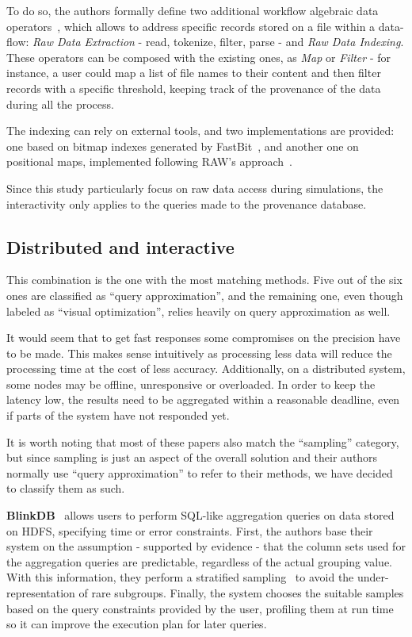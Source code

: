 To do so, the authors formally define two additional workflow 
algebraic data operators~\cite{Ogasawara2011}, which allows to address 
specific records stored on a file within a data-flow: \emph{Raw Data Extraction} 
- read, tokenize, filter, parse - and \emph{Raw Data Indexing}. These 
operators can be composed with the existing ones, as \emph{Map} or 
\emph{Filter} - for instance, a user could map a list of file names to their 
content and then filter records with a specific threshold, keeping track of 
the provenance of the data during all the process.

The indexing can rely on external tools, and two implementations are provided:
one based on bitmap indexes generated by FastBit~\cite{Wu2009},
and another one on positional maps, implemented following RAW's 
approach~\cite{Karpathiotakis2014}.

Since this study particularly focus on raw data access during simulations, the 
interactivity only applies to the queries made to the provenance database. 

\subsection{Distributed and interactive}
This combination is the one with the most matching methods. Five 
out of the six ones are classified as ``query approximation'', and the 
remaining one, even though labeled as ``visual optimization'', relies heavily 
on query approximation as well.

It would seem that to get fast responses some compromises on the precision 
have to be made. This makes sense intuitively as processing less 
data will reduce the processing time at the cost of less accuracy. 
Additionally, on a distributed system, some nodes may be offline, 
unresponsive or overloaded. In order to keep the latency low, the results 
need to be aggregated within a reasonable deadline, even if parts of the system 
have not responded yet.

It is worth noting that most of these papers also match the ``sampling''
category, but since sampling is just an aspect of the overall solution and their 
authors normally use ``query approximation'' to refer to their methods, we have 
decided to classify them as such.

\medskip

\textbf{BlinkDB}~\cite{Agarwal2013} allows users to perform SQL-like aggregation 
queries on data stored on HDFS, specifying time or error constraints. First, 
the authors base their system on the assumption - supported by evidence - that 
the column sets used for the aggregation queries are predictable, regardless of 
the actual grouping value. With this information, they perform a stratified 
sampling~\cite{Lohr2009} to avoid the under-representation of rare subgroups. 
Finally, the system chooses the suitable samples based on the query constraints 
provided by the user, profiling them at run time so it can improve the 
execution plan for later queries.

